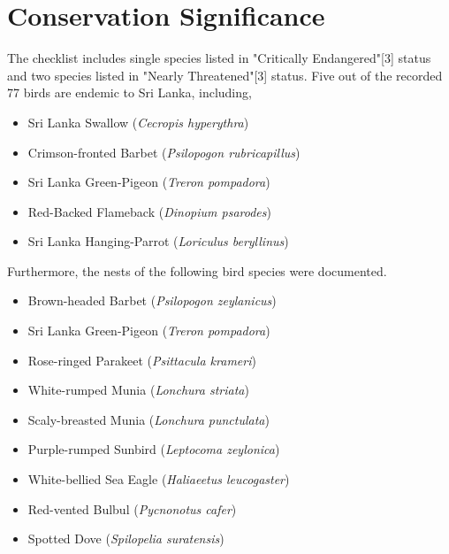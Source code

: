 \section{Conservation Significance}
The checklist includes single species listed in "Critically Endangered"[3] status and two species listed in "Nearly Threatened"[3] status. Five out of the recorded 77 birds are endemic to Sri Lanka, including,
\begin{itemize}
    \item Sri Lanka Swallow (\textit{Cecropis hyperythra})
\item Crimson-fronted Barbet (\textit{Psilopogon rubricapillus})
\item Sri Lanka Green-Pigeon (\textit{Treron pompadora})
\item Red{-}Backed Flameback (\textit{Dinopium psarodes})
 \item Sri Lanka Hanging-Parrot (\textit{Loriculus beryllinus})
\end{itemize}
Furthermore, the nests of the following bird species were documented.
\begin{itemize}
\item Brown-headed Barbet (\textit{Psilopogon zeylanicus})
\item Sri Lanka Green-Pigeon (\textit{Treron pompadora})
\item Rose-ringed Parakeet (\textit{Psittacula krameri})
\item White-rumped Munia (\textit{Lonchura striata})
\item Scaly-breasted Munia (\textit{Lonchura punctulata})
\item Purple-rumped Sunbird (\textit{Leptocoma zeylonica})
\item White-bellied Sea Eagle (\textit{Haliaeetus leucogaster})
\item Red-vented Bulbul (\textit{Pycnonotus cafer})
\item Spotted Dove (\textit{Spilopelia suratensis})
\end{itemize}
